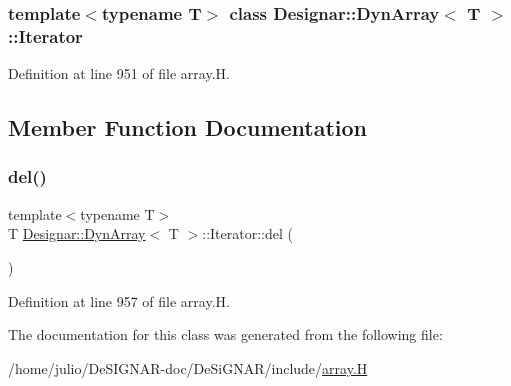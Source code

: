 \subsubsection*{template$<$typename T$>$\newline
class Designar\+::\+Dyn\+Array$<$ T $>$\+::\+Iterator}



Definition at line 951 of file array.\+H.



\subsection{Member Function Documentation}
\mbox{\label{class_designar_1_1_dyn_array_1_1_iterator_a3d700006f23d3c4b63e109edef32410f}} 
\subsubsection{\texorpdfstring{del()}{del()}}
{\footnotesize\ttfamily template$<$typename T$>$ \\
T \hyperlink{class_designar_1_1_dyn_array}{Designar\+::\+Dyn\+Array}$<$ T $>$\+::Iterator\+::del (\begin{DoxyParamCaption}{ }\end{DoxyParamCaption})\hspace{0.3cm}{\ttfamily [inline]}}



Definition at line 957 of file array.\+H.



The documentation for this class was generated from the following file\+:\begin{DoxyCompactItemize}
\item 
/home/julio/\+De\+S\+I\+G\+N\+A\+R-\/doc/\+De\+Si\+G\+N\+A\+R/include/\hyperlink{array_8_h}{array.\+H}\end{DoxyCompactItemize}
